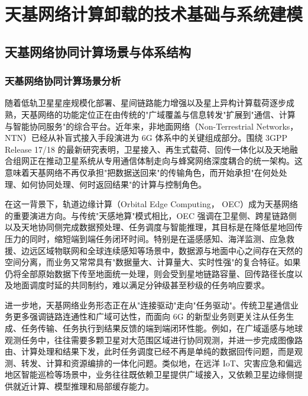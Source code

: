 
\chapter{天基网络计算卸载的技术基础与系统建模}

\section{天基网络协同计算场景与体系结构}

\subsection{天基网络协同计算场景分析}

随着低轨卫星星座规模化部署、星间链路能力增强以及星上异构计算载荷逐步成熟，天基网络的功能定位正在由传统的"广域覆盖与信息转发"扩展到"通信、计算与智能协同服务"的综合平台。近年来，非地面网络（Non-Terrestrial Networks， NTN）已经从补盲式接入手段演进为 6G 体系中的关键组成部分。围绕 3GPP Release 17/18 的最新研究表明，卫星接入、再生式载荷、回传一体化以及天地融合组网正在推动卫星系统从专用通信体制走向与蜂窝网络深度耦合的统一架构\cite{Saad2024NTNRel1718,Wang2025NTN6G,Mahboob2024AINTN}。这意味着天基网络不再仅承担"把数据送回来"的传输角色，而开始承担"在何处处理、如何协同处理、何时返回结果"的计算与控制角色。

在这一背景下，轨道边缘计算（Orbital Edge Computing， OEC）成为天基网络的重要演进方向。与传统"天感地算"模式相比，OEC 强调在卫星侧、跨星链路侧以及天地协同侧完成数据预处理、任务调度与智能推理，其目标是在降低星地回传压力的同时，缩短端到端任务闭环时间\cite{Yin2025OECSurvey,Huang2024ICNLSMC}。特别是在遥感感知、海洋监测、应急救援、边远区域物联网和全球连续感知等场景中，数据源与地面中心之间存在天然的空间分离，而业务又常常具有"数据量大、计算量大、实时性强"的复合特征。如果仍将全部原始数据下传至地面统一处理，则会受到星地链路容量、回传路径长度以及地面调度时延的共同制约，难以满足分钟级甚至秒级的任务响应要求\cite{Zhai2024SECO,Qu2024E2E,Zhao2025WideAreaEdge}。

进一步地，天基网络业务形态正在从"连接驱动"走向"任务驱动"。传统卫星通信业务更多强调链路连通性和广域可达性，而面向 6G 的新型业务则更关注从任务生成、任务传输、任务执行到结果反馈的端到端闭环性能。例如，在广域遥感与地球观测任务中，往往需要多颗卫星对大范围区域进行协同观测，并进一步完成图像路由、计算处理和结果下发，此时任务调度已经不再是单纯的数据回传问题，而是观测、转发、计算和资源编排的一体化问题\cite{Zhai2024SECO}。类似地，在远洋 IoT、灾害应急和偏远地区智能巡检等场景中，业务往往既依赖卫星提供广域接入，又依赖卫星边缘侧提供就近计算、模型推理和局部缓存能力\cite{Zhao2025WideAreaEdge,Sun2026LLMOffloading}。

